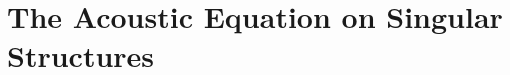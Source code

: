 \chapter{The Acoustic Equation on Singular Structures} \label{ch:ScalarSystem}











\begin{subappendices}





\end{subappendices}